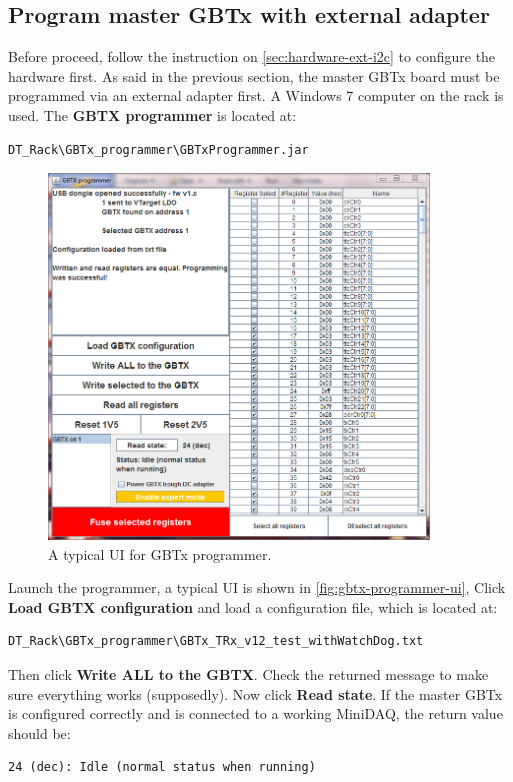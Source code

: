\subsection{Program master GBTx with external \itwoc adapter}
Before proceed, follow the instruction on \autoref{sec:hardware-ext-i2c} to
configure the hardware first.
As said in the previous section, the master GBTx board must be programmed via an
external \itwoc adapter first.
A Windows 7 computer on the rack is used. The \textbf{GBTX programmer} is
located at:

\begin{verbatim}
DT_Rack\GBTx_programmer\GBTxProgrammer.jar
\end{verbatim}

\begin{figure}[ht]
    \centering
    \includegraphics[width=0.9\textwidth]{res/gbtx_programmer_v1_ui.png}
    \caption{A typical UI for GBTx programmer.}
    \label{fig:gbtx-programmer-ui}
\end{figure}

Launch the programmer, a typical UI is shown in
\autoref{fig:gbtx-programmer-ui},
Click \textbf{Load GBTX configuration} and load a configuration file, which is
located at:

\begin{verbatim}
DT_Rack\GBTx_programmer\GBTx_TRx_v12_test_withWatchDog.txt
\end{verbatim}

Then click \textbf{Write ALL to the GBTX}. Check the returned message to make
sure everything works (supposedly).
Now click \textbf{Read state}.
If the master GBTx is configured correctly and is connected to a working
MiniDAQ, the return value should be:

\begin{verbatim}
24 (dec): Idle (normal status when running)
\end{verbatim}
